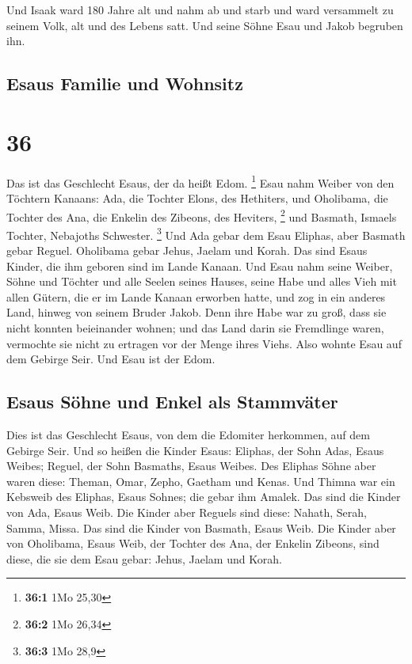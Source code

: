  Und Isaak ward 180 Jahre alt  und nahm ab
und starb und ward versammelt zu seinem Volk, alt und des Lebens satt.
Und seine Söhne Esau und Jakob begruben ihn.

\hypertarget{esaus-familie-und-wohnsitz}{%
\subsection{Esaus Familie und
Wohnsitz}\label{esaus-familie-und-wohnsitz}}

\hypertarget{section-35}{%
\section{36}\label{section-35}}

 Das ist das Geschlecht Esaus, der da heißt Edom.
\footnote{\textbf{36:1} 1Mo 25,30}  Esau nahm Weiber von
den Töchtern Kanaans: Ada, die Tochter Elons, des Hethiters, und
Oholibama, die Tochter des Ana, die Enkelin des Zibeons, des Heviters,
\footnote{\textbf{36:2} 1Mo 26,34}  und Basmath, Ismaels
Tochter, Nebajoths Schwester. \footnote{\textbf{36:3} 1Mo 28,9}
 Und Ada gebar dem Esau Eliphas, aber Basmath gebar
Reguel.  Oholibama gebar Jehus, Jaelam und Korah. Das sind
Esaus Kinder, die ihm geboren sind im Lande Kanaan.  Und
Esau nahm seine Weiber, Söhne und Töchter und alle Seelen seines Hauses,
seine Habe und alles Vieh mit allen Gütern, die er im Lande Kanaan
erworben hatte, und zog in ein anderes Land, hinweg von seinem Bruder
Jakob.  Denn ihre Habe war zu groß, dass sie nicht konnten
beieinander wohnen; und das Land darin sie Fremdlinge waren, vermochte
sie nicht zu ertragen vor der Menge ihres Viehs.  Also
wohnte Esau auf dem Gebirge Seir. Und Esau ist der Edom.

\hypertarget{esaus-suxf6hne-und-enkel-als-stammvuxe4ter}{%
\subsection{Esaus Söhne und Enkel als
Stammväter}\label{esaus-suxf6hne-und-enkel-als-stammvuxe4ter}}

 Dies ist das Geschlecht Esaus, von dem die Edomiter
herkommen, auf dem Gebirge Seir.  Und so heißen die
Kinder Esaus: Eliphas, der Sohn Adas, Esaus Weibes; Reguel, der Sohn
Basmaths, Esaus Weibes.  Des Eliphas Söhne aber waren
diese: Theman, Omar, Zepho, Gaetham und Kenas.  Und
Thimna war ein Kebsweib des Eliphas, Esaus Sohnes; die gebar ihm Amalek.
Das sind die Kinder von Ada, Esaus Weib.  Die Kinder aber
Reguels sind diese: Nahath, Serah, Samma, Missa. Das sind die Kinder von
Basmath, Esaus Weib.  Die Kinder aber von Oholibama,
Esaus Weib, der Tochter des Ana, der Enkelin Zibeons, sind diese, die
sie dem Esau gebar: Jehus, Jaelam und Korah.

